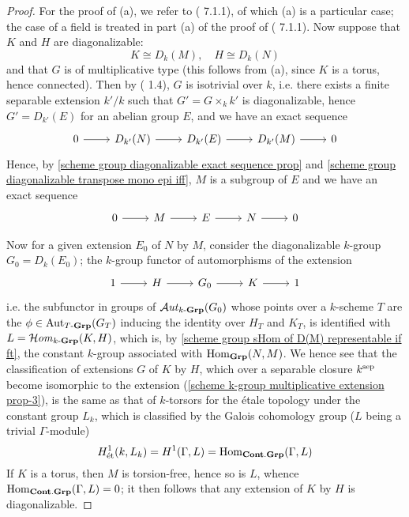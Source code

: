 \begin{proof}
For the proof of (a), we refer to (\cite{SGA3-2}  7.1.1), of which (a) is a particular case; the case of a field is treated in part (a) of the proof of (\cite{SGA3-2}  7.1.1). Now suppose that $K$ and $H$ are diagonalizable:
\[K\cong D_k(M),\quad H\cong D_k(N)\]
and that $G$ is of multiplicative type (this follows from (a), since $K$ is a torus, hence connected). Then by (\cite{SGA3-2}  1.4), $G$ is isotrivial over $k$, i.e. there exists a finite separable extension $k'/k$ such that $G'=G\times_kk'$ is diagonalizable, hence $G'=D_{k'}(E)$ for an abelian group $E$, and we have an exact sequence
\begin{equation}\label{scheme k-group multiplicative extension prop-1}
\begin{tikzcd}
0\ar[r]&D_{k'}(N)\ar[r]&D_{k'}(E)\ar[r]&D_{k'}(M)\ar[r]&0
\end{tikzcd}
\end{equation}
Hence, by \cref{scheme group diagonalizable exact sequence prop} and \cref{scheme group diagonalizable transpose mono epi iff}, $M$ is a subgroup of $E$ and we have an exact sequence
\begin{equation}\label{scheme k-group multiplicative extension prop-2}
\begin{tikzcd}
0\ar[r]&M\ar[r]&E\ar[r]&N\ar[r]&0
\end{tikzcd}
\end{equation}

Now for a given extension $E_0$ of $N$ by $M$, consider the diagonalizable $k$-group $G_0=D_k(E_0)$; the $k$-group functor of automorphisms of the extension
\begin{equation}\label{scheme k-group multiplicative extension prop-3}
\begin{tikzcd}
1\ar[r]&H\ar[r]&G_0\ar[r]&K\ar[r]&1
\end{tikzcd}
\end{equation}
i.e. the subfunctor in groups of $\operatorname{\mathcal{A}\hspace*{-0.2pt}\textit{ut}\hspace{0.5pt}}_{k\textup{-}\mathbf{Grp}}(G_0)$ whose points over a $k$-scheme $T$ are the $\phi\in\mathrm{Aut}_{T\textup{-}\mathbf{Grp}}(G_T)$ inducing the identity over $H_T$ and $K_T$, is identified with $L=\operatorname{\mathcal{H}\hspace*{-0.4pt}\textit{om}\hspace{0.5pt}}_{k\textup{-}\mathbf{Grp}}(K,H)$, which is, by \cref{scheme group sHom of D(M) representable if ft}, the constant $k$-group associated with $\mathrm{Hom}_{\mathbf{Grp}}(N,M)$. We hence see that the classification of extensions $G$ of $K$ by $H$, which over a separable closure $k^{\mathrm{sep}}$ become isomorphic to the extension (\ref{scheme k-group multiplicative extension prop-3}), is the same as that of $k$-torsors for the \'etale topology under the constant group $L_k$, which is classified by the Galois cohomology group ($L$ being a trivial $\Gamma$-module)
\[H^1_{\textup{\'et}}(k,L_k)=H^1(\Gamma,L)=\mathrm{Hom}_{\mathbf{Cont}.\mathbf{Grp}}(\Gamma,L)\]
If $K$ is a torus, then $M$ is torsion-free, hence so is $L$, whence $\mathrm{Hom}_{\mathbf{Cont}.\mathbf{Grp}}(\Gamma,L)=0$; it then follows that any extension of $K$ by $H$ is diagonalizable.
\end{proof}

